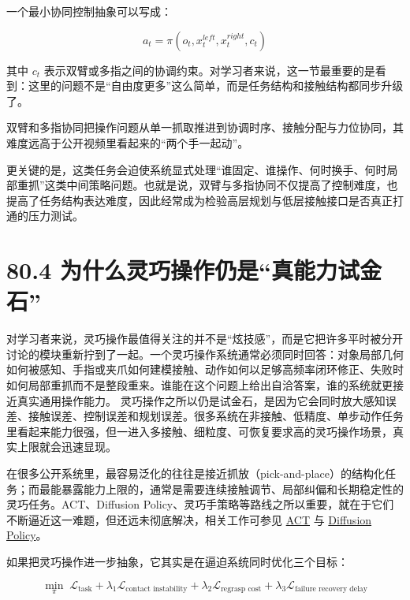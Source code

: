 一个最小协同控制抽象可以写成：

\begin{equation*}
a_t = \pi(o_t, x_t^{left}, x_t^{right}, c_t)
\end{equation*}

其中 \(c_t\) 表示双臂或多指之间的协调约束。对学习者来说，这一节最重要的是看到：这里的问题不是“自由度更多”这么简单，而是任务结构和接触结构都同步升级了。

双臂和多指协同把操作问题从单一抓取推进到协调时序、接触分配与力位协同，其难度远高于公开视频里看起来的“两个手一起动”。

更关键的是，这类任务会迫使系统显式处理“谁固定、谁操作、何时换手、何时局部重抓”这类中间策略问题。也就是说，双臂与多指协同不仅提高了控制难度，也提高了任务结构表达难度，因此经常成为检验高层规划与低层接触接口是否真正打通的压力测试。

\section*{80.4 为什么灵巧操作仍是“真能力试金石”}


对学习者来说，灵巧操作最值得关注的并不是“炫技感”，而是它把许多平时被分开讨论的模块重新拧到了一起。一个灵巧操作系统通常必须同时回答：对象局部几何如何被感知、手指或夹爪如何建模接触、动作如何以足够高频率闭环修正、失败时如何局部重抓而不是整段重来。谁能在这个问题上给出自洽答案，谁的系统就更接近真实通用操作能力。 灵巧操作之所以仍是试金石，是因为它会同时放大感知误差、接触误差、控制误差和规划误差。很多系统在非接触、低精度、单步动作任务里看起来能力很强，但一进入多接触、细粒度、可恢复要求高的灵巧操作场景，真实上限就会迅速显现。

在很多公开系统里，最容易泛化的往往是接近抓放（pick-and-place）的结构化任务；而最能暴露能力上限的，通常是需要连续接触调节、局部纠偏和长期稳定性的灵巧任务。ACT、Diffusion Policy、灵巧手策略等路线之所以重要，就在于它们不断逼近这一难题，但还远未彻底解决，相关工作可参见 \href{https://arxiv.org/abs/2304.13705}{ACT} 与 \href{https://arxiv.org/abs/2303.04137}{Diffusion Policy}。

如果把灵巧操作进一步抽象，它其实是在逼迫系统同时优化三个目标：

\begingroup
\scriptsize
\begin{equation*}
\min_{\pi} \; \mathcal{L}_{\text{task}}
+ \lambda_1 \mathcal{L}_{\text{contact instability}}
+ \lambda_2 \mathcal{L}_{\text{regrasp cost}}
+ \lambda_3 \mathcal{L}_{\text{failure recovery delay}}
\end{equation*}
\endgroup

